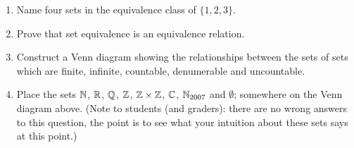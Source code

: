 \begin{enumerate}
\item Name four sets in the equivalence class of $\{1, 2, 3\}$.

\wbitemsep

\item Prove that set equivalence is an equivalence relation.

\wbvfill

\workbookpagebreak

\item Construct a Venn diagram showing the relationships between the sets of
sets which are finite, infinite, countable, denumerable and uncountable.

\wbvfill

\item Place the sets ${\mathbb N}$, ${\mathbb R}$, ${\mathbb Q}$, ${\mathbb Z}$, ${\mathbb Z} \times {\mathbb Z}$, ${\mathbb C}$, ${\mathbb N}_{2007}$ and $\emptyset$; 
somewhere on the Venn diagram above. (Note to students (and graders): 
there are no wrong answers to this question, the point is to see what 
your intuition about these sets says at this point.)

\wbvfill

\end{enumerate}
 

